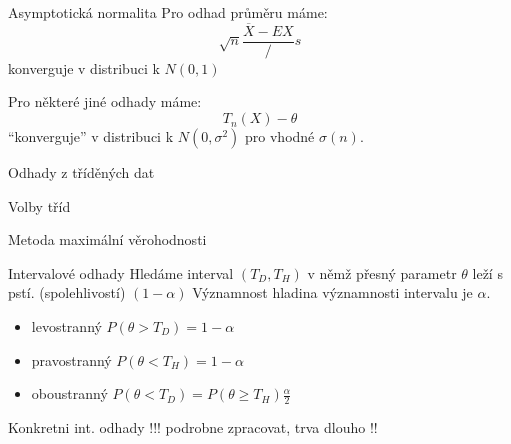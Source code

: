 \documentclass[smaller]{beamer}
\def\ol#1{\overline{#1}}
\begin{document}
\begin{frame}{Asymptotická normalita}
Pro odhad průměru máme:
\[
 \sqrt{n}\frac{\ol{X} - EX}/s 
\]
konverguje v distribuci k $N(0,1)$

Pro některé jiné odhady máme:
\[
 T_n(X) - \theta
\]
``konverguje'' v distribuci k $N(0,\sigma^2)$ pro vhodné $\sigma(n)$.
\end{frame}

\begin{frame}{Odhady z tříděných dat}
\end{frame}

\begin{frame}{Volby tříd}
\end{frame}

\begin{frame}{Metoda maximální věrohodnosti}
\end{frame}

\begin{frame}{Intervalové odhady}
Hledáme interval $(T_D, T_H)$ v němž přesný parametr $\theta$ leží s pstí. ({\df spolehlivostí}) $(1-\alpha)$
Významnost {\df hladina významnosti} intervalu je $\alpha$.

\begin{itemize}
 \item levostranný $P(\theta > T_D) = 1-\alpha$
 \item pravostranný $P(\theta < T_H) = 1- \alpha$
 \item oboustranný $P(\theta <T_D) = P(\theta \ge T_H) \frac{\alpha}{2}$
\end{itemize}

\end{frame}

\begin{frame}{Konkretni int. odhady !!! podrobne zpracovat, trva dlouho !!}
 
\end{frame}
\end{document}
